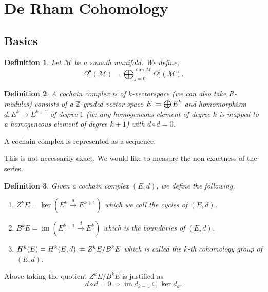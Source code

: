\documentclass[10pt]{article}
\newtheorem{definition}{Definition}[section]
\DeclareMathOperator{\image}{im}
\newcommand{\defeq}{\vcentcolon=}
\newcommand{\Z}[0]{\mathbb{Z}}
\newcommand{\M}[0]{\mathcal{M}}
\begin{document}
\section{De Rham Cohomology}

\subsection{Basics}

\begin{definition}
  Let $\M$ be a smooth manifold. We define,
  \begin{equation*}
    \Omega^\bullet(\M) = \bigoplus_{j=0}^{\dim\M}\Omega^j(\M).
  \end{equation*}
\end{definition}

\begin{definition}
  A cochain complex is of $k$-vectorspace (we can also take $R$-modules) consists of a $\Z$-graded vector space $E \defeq \bigoplus E^k$ and homomorphism $d:E^k\to E^{k+1}$ of degree $1$ (ie: any homogeneous element of degree $k$ is mapped to a homogeneous element of degree $k+1$) with $d\circ d = 0$.
\end{definition}

A cochain complex is represented as a sequence,
\begin{center}
\end{center}

This is not necessarily exact. We would like to measure the non-exactness of the series. 

\begin{definition}
  Given a cochain complex $(E,d)$, we define the following,
  \begin{enumerate}
    \item $Z^kE = \ker(E^k\stackrel{d}{\to}E^{k+1})$ which we call the cycles of $(E,d)$.
    \item $B^kE = \image(E^{k-1}\stackrel{d}{\to}E^k)$ which is the boundaries of $(E,d)$.
    \item $H^k(E) = H^k(E,d)\defeq Z^kE/B^kE$ which is called the $k$-th cohomology group of $(E,d)$.
  \end{enumerate}
\end{definition}

Above taking the quotient $Z^kE/B^kE$ is justified as 
\begin{equation*}
  d\circ d = 0\Rightarrow \image d_{k-1}\subseteq\ker d_k.
\end{equation*}
\end{document}
